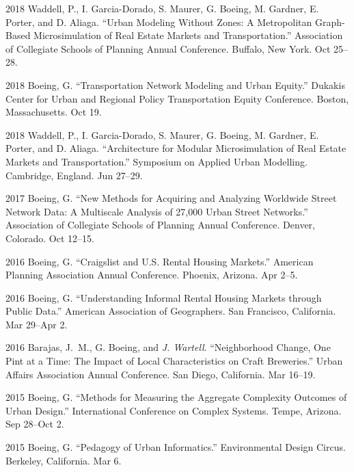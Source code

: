 \documentclass[12pt,letterpaper]{report}
\begin{document}
\begin{tablist}
        \item[2018] \tab{}Waddell, P., I. Garcia-Dorado, S. Maurer, G. Boeing, M. Gardner, E. Porter, and D. Aliaga. \enquote{Urban Modeling Without Zones: A Metropolitan Graph-Based Microsimulation of Real Estate Markets and Transportation.} Association of Collegiate Schools of Planning Annual Conference. Buffalo, New York. Oct 25--28.

        \item[2018] \tab{}Boeing, G. \enquote{Transportation Network Modeling and Urban Equity.} Dukakis Center for Urban and Regional Policy Transportation Equity Conference. Boston, Massachusetts. Oct 19.

        \item[2018] \tab{}Waddell, P., I. Garcia-Dorado, S. Maurer, G. Boeing, M. Gardner, E. Porter, and D. Aliaga. \enquote{Architecture for Modular Microsimulation of Real Estate Markets and Transportation.} Symposium on Applied Urban Modelling. Cambridge, England. Jun 27--29.

        \item[2017] \tab{}Boeing, G. \enquote{New Methods for Acquiring and Analyzing Worldwide Street Network Data: A Multiscale Analysis of 27,000 Urban Street Networks.} Association of Collegiate Schools of Planning Annual Conference. Denver, Colorado. Oct 12--15.

        \item[2016] \tab{}Boeing, G. \enquote{Craigslist and U.S. Rental Housing Markets.} American Planning Association Annual Conference. Phoenix, Arizona. Apr 2--5.

        \item[2016] \tab{}Boeing, G. \enquote{Understanding Informal Rental Housing Markets through Public Data.} American Association of Geographers. San Francisco, California. Mar 29--Apr 2.

        \item[2016] \tab{}Barajas, J.~M., G. Boeing, and \textit{J. Wartell}. \enquote{Neighborhood Change, One Pint at a Time: The Impact of Local Characteristics on Craft Breweries.} Urban Affairs Association Annual Conference. San Diego, California. Mar 16--19.

        \item[2015] \tab{}Boeing, G. \enquote{Methods for Measuring the Aggregate Complexity Outcomes of Urban Design.} International Conference on Complex Systems. Tempe, Arizona. Sep 28--Oct 2.

        \item[2015] \tab{}Boeing, G. \enquote{Pedagogy of Urban Informatics.} Environmental Design Circus. Berkeley, California. Mar 6.


\end{tablist}
\end{document}
